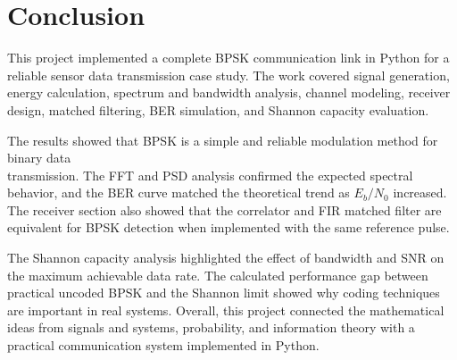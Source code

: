 \chapter{Conclusion}

This project implemented a complete BPSK communication link in Python for a reliable sensor data transmission case study. 
The work covered signal generation, energy calculation, spectrum and bandwidth analysis, channel modeling, receiver design, 
matched filtering, BER simulation, and Shannon capacity evaluation.

The results showed that BPSK is a simple and reliable modulation method for binary data \\transmission. 
The FFT and PSD analysis confirmed the expected spectral behavior, and the BER curve matched the theoretical trend 
as \(E_b/N_0\) increased. The receiver section also showed that the correlator and FIR matched filter are equivalent for 
BPSK detection when implemented with the same reference pulse.

The Shannon capacity analysis highlighted the effect of bandwidth and SNR on the maximum achievable data rate. 
The calculated performance gap between practical uncoded BPSK and the Shannon limit showed why coding techniques are important in real systems. 
Overall, this project connected the mathematical ideas from signals and systems, probability, and information theory with a practical communication system implemented in Python.